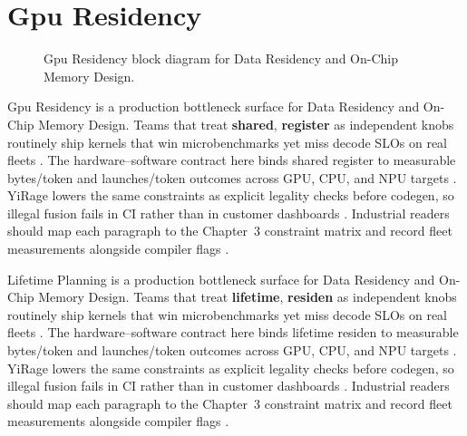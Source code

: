 \section{Gpu Residency}
\label{sec:gpu_residency}
\begin{figure}[t]
\centering
{}
\caption{Gpu Residency block diagram for Data Residency and On-Chip Memory Design.}
\label{fig:gpu_residency_architecture}
\end{figure}


Gpu Residency is a production bottleneck surface for Data Residency and On-Chip Memory Design. Teams that treat \textbf{shared}, \textbf{register} as independent knobs routinely ship kernels that win microbenchmarks yet miss decode SLOs on real fleets \citep{taxbreak2026,semianalysis2024tma}. The hardware--software contract here binds shared register to measurable bytes/token and launches/token outcomes across GPU, CPU, and NPU targets \citep{memoryfloor2026,amd2024xdna}. YiRage lowers the same constraints as explicit legality checks before codegen, so illegal fusion fails in CI rather than in customer dashboards \citep{nvidia2022hopper,amd2024aie}. Industrial readers should map each paragraph to the Chapter~3 constraint matrix and record fleet measurements alongside compiler flags \citep{semianalysis2024tma,dlbook}.

Lifetime Planning is a production bottleneck surface for Data Residency and On-Chip Memory Design. Teams that treat \textbf{lifetime}, \textbf{residen} as independent knobs routinely ship kernels that win microbenchmarks yet miss decode SLOs on real fleets \citep{liu2024deepseekv3,memoryfloor2026}. The hardware--software contract here binds lifetime residen to measurable bytes/token and launches/token outcomes across GPU, CPU, and NPU targets \citep{patel2025llminference,nvidia2022hopper}. YiRage lowers the same constraints as explicit legality checks before codegen, so illegal fusion fails in CI rather than in customer dashboards \citep{taxbreak2026,semianalysis2024tma}. Industrial readers should map each paragraph to the Chapter~3 constraint matrix and record fleet measurements alongside compiler flags \citep{memoryfloor2026,amd2024xdna}.

